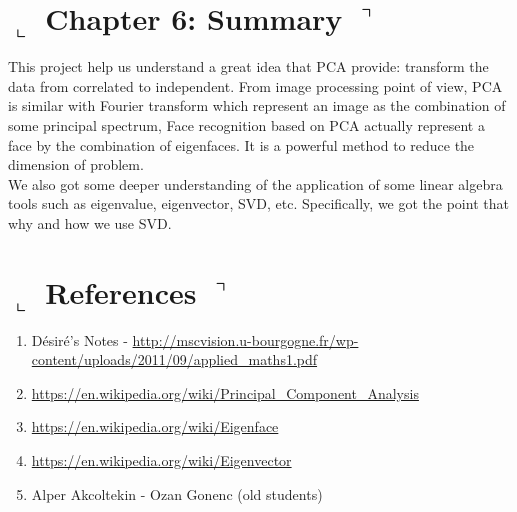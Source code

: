 \documentclass[]{article}
\begin{document}
\section*{ $\llcorner$  Chapter 6: Summary $\urcorner$}

This project help us understand a great idea that PCA provide: transform the data from correlated to independent. From image processing point of view, PCA is similar with Fourier transform which represent an image as the combination of some principal spectrum, Face recognition based on PCA actually represent a face by the combination of eigenfaces. It is a powerful method to reduce the dimension of problem.
\\

We also got some deeper understanding of the application of some linear algebra tools such as eigenvalue, eigenvector, SVD, etc. Specifically, we got the point that why and how we use SVD. 

\section*{ $\llcorner$  References $\urcorner$}
	\begin{enumerate}
		\item Désiré’s Notes - \url{http://mscvision.u-bourgogne.fr/wp-content/uploads/2011/09/applied_maths1.pdf}
		\item \url{https://en.wikipedia.org/wiki/Principal_Component_Analysis}
		\item \url{https://en.wikipedia.org/wiki/Eigenface}
		\item \url{https://en.wikipedia.org/wiki/Eigenvector}
		\item Alper Akcoltekin - Ozan Gonenc (old students)
	\end{enumerate}
\end{document}
